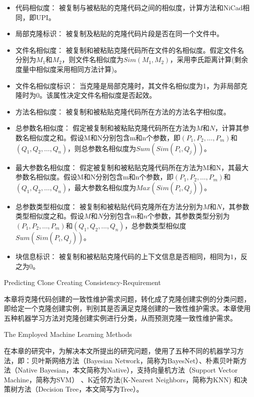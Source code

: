 \begin{itemize}
\item
代码相似度：
被复制与被粘贴的克隆代码之间的相似度，计算方法和NiCad相同，即UPI\cite{roy2008nicad}。
\item
局部克隆标识：
被复制及粘贴的克隆代码片段是否在同一个文件中。
\item
文件名相似度：
被复制和被粘贴克隆代码所在文件的名相似度。假定文件名分别为$M_1$和$M_2$，则文件名相似度为$Sim(M_1,M_2)$，采用李氏距离\cite{levenshtein1966binary}计算(剩余度量中相似度采用相同方法计算)。
\item
文件名相似度标识：
当克隆是局部克隆时，其文件名相似度为1，为非局部克隆时为0。该属性决定文件名相似度是否起效。
\item
方法名相似度：
被复制和被粘贴克隆代码所在方法的方法名字相似度。
\item
总参数名相似度：
假定被复制和被粘贴克隆代码所在方法为$M$和$N$，计算其参数名相似度之和。假设M和N分别包含m和n个参数，即$(P_1,P_2,…,P_m)$和$(Q_1,Q_2,…,Q_n)$，则总参数名相似度为$Sum(Sim(P_i,Q_j))$。
\item
最大参数名相似度：
假定被复制和被粘贴克隆代码所在方法为M和N，其最大参数名相似度。假设M和N分别包含m和n个参数，即$(P_1,P_2,…,P_m)$和$(Q_1,Q_2,…,Q_n)$，最大参数名相似度为$Max(Sim(P_i,Q_j))$。
\item 
总参数类型相似度：
被复制和被粘贴代码克隆所在方法分别为$M$和$N$，其参数类型相似度之和。假设$M$和$N$分别包含$m$和$n$个参数，其参数类型分别为$(P_1,P_2,…,P_m)$和$(Q_1,Q_2,…,Q_n)$，总参数类型相似度$Sum(Sim(P_i,Q_j))$。
\item
块信息标识：
被复制和被粘贴克隆代码的上下文信息是否相同，相同为$1$，反之为$0$。
\end{itemize}

{Predicting Clone Creating Consistency-Requirement}

本章将克隆代码创建的一致性维护需求问题，转化成了克隆创建实例的分类问题，即给定一个克隆创建实例，判别其是否满足克隆创建的一致性维护需求。本章使用五种机器学习方法对克隆创建实例进行分类，从而预测克隆一致性维护需求。


{The Employed Machine Learning Methods}
\label{lab-machine}

在本章的研究中，为解决本文所提出的研究问题，使用了五种不同的机器学习方法，即：贝叶斯网络方法（Bayesian Network，简称为BayesNet）\cite{friedman1997bayesian}、朴素贝叶斯方法（Native Bayesian，本文简称为Native）\cite{john1995estimating}，支持向量机方法（Support Vector Machine，简称为SVM）\cite{platt199912} 、K近邻方法(K-Nearest Neighbors，简称为KNN) \cite{aha1991instance}和决策树方法（Decision Tree，本文简写为Tree）\cite{quinlan2014c4}。

